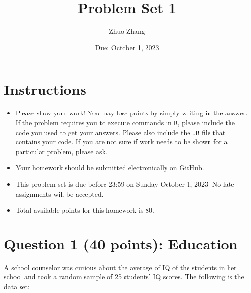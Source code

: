 \documentclass[12pt,letterpaper]{article}
\title{Problem Set 1}
\date{Due: October 1, 2023}
\author{Zhuo Zhang}
\begin{document}
	\maketitle
	
	\section*{Instructions}
	\begin{itemize}
	\item Please show your work! You may lose points by simply writing in the answer. If the problem requires you to execute commands in \texttt{R}, please include the code you used to get your answers. Please also include the \texttt{.R} file that contains your code. If you are not sure if work needs to be shown for a particular problem, please ask.
\item Your homework should be submitted electronically on GitHub.
\item This problem set is due before 23:59 on Sunday October 1, 2023. No late assignments will be accepted.
\item Total available points for this homework is 80.
	\end{itemize}
	
	\vspace{1cm}
	\section*{Question 1 (40 points): Education}

A school counselor was curious about the average of IQ of the students in her school and took a random sample of 25 students' IQ scores. The following is the data set:\\
\vspace{.5cm}
\end{document}
